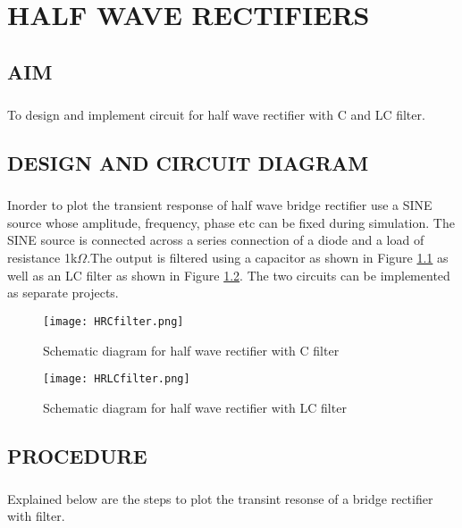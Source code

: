 \chapter{HALF WAVE RECTIFIERS}

\section*{AIM}
\paragraph{}To design and implement circuit for half wave rectifier with C and LC filter.

\section*{DESIGN AND CIRCUIT DIAGRAM}
\paragraph{}

Inorder to plot the transient response of half wave bridge rectifier use a SINE source whose amplitude, frequency, phase etc can be fixed during simulation. The SINE source is connected across a series connection of a diode and a load of resistance 1k$\Omega$.The output is filtered using a capacitor as shown in Figure \ref{HRCfilter}	as well as an LC filter as shown in Figure \ref{HRLCfilter}. The two circuits can be implemented as separate projects.

\begin{figure}[h]
\centering
\texttt{[image: HRCfilter.png]}
\caption{Schematic diagram for half wave rectifier with C filter}
\label{HRCfilter}
\end{figure}

\begin{figure}[h]
\centering
\texttt{[image: HRLCfilter.png]}
\caption{Schematic diagram for half wave rectifier with LC filter}
\label{HRLCfilter}
\end{figure}


\section*{PROCEDURE}

\paragraph{}Explained below are the steps to plot the transint resonse of a bridge rectifier with filter. 
